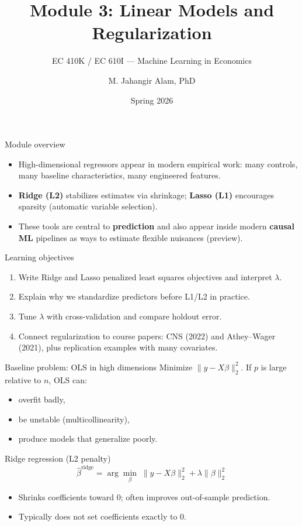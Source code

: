 \documentclass[aspectratio=169,11pt]{beamer}
\title[Regularization]{Module 3: Linear Models and Regularization}
\subtitle{EC 410K / EC 610I --- Machine Learning in Economics}
\author{M. Jahangir Alam, PhD}
\institute{Wilfrid Laurier University}
\date{Spring 2026}
\begin{document}
\begin{frame}[plain]
  \titlepage
\end{frame}

\begin{frame}{Module overview}
  \begin{itemize}
    \item High-dimensional regressors appear in modern empirical work: many controls, many baseline characteristics, many engineered features.
    \item \textbf{Ridge (L2)} stabilizes estimates via shrinkage; \textbf{Lasso (L1)} encourages sparsity (automatic variable selection).
    \item These tools are central to \textbf{prediction} and also appear inside modern \textbf{causal ML} pipelines as ways to estimate flexible nuisances (preview).
  \end{itemize}
\end{frame}

\begin{frame}{Learning objectives}
  \begin{enumerate}
    \item Write Ridge and Lasso penalized least squares objectives and interpret \(\lambda\).
    \item Explain why we standardize predictors before L1/L2 in practice.
    \item Tune \(\lambda\) with cross-validation and compare holdout error.
    \item Connect regularization to course papers: CNS (2022) and Athey--Wager (2021), plus replication examples with many covariates.
  \end{enumerate}
\end{frame}

\begin{frame}{Baseline problem: OLS in high dimensions}
  Minimize \(\|y - X\beta\|_2^2\). If \(p\) is large relative to \(n\), OLS can:
  \begin{itemize}
    \item overfit badly,
    \item be unstable (multicollinearity),
    \item produce models that generalize poorly.
  \end{itemize}
\end{frame}

\begin{frame}{Ridge regression (L2 penalty)}
  \[
    \widehat{\beta}^{\text{ridge}}
    = \arg\min_{\beta} \;\|y - X\beta\|_2^2 + \lambda \|\beta\|_2^2
  \]
  \begin{itemize}
    \item Shrinks coefficients toward 0; often improves out-of-sample prediction.
    \item Typically does not set coefficients exactly to 0.
  \end{itemize}
\end{frame}
\end{document}
